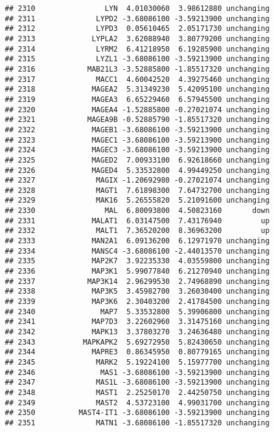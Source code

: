 \documentclass[]{article}
\begin{document}
\begin{verbatim}
## 2310                LYN  4.01030060  3.98612880 unchanging
## 2311              LYPD2 -3.68086100 -3.59213900 unchanging
## 2312              LYPD3  0.05610465  2.05171730 unchanging
## 2313             LYPLA2  3.62088940  3.80779200 unchanging
## 2314              LYRM2  6.41218950  6.19285900 unchanging
## 2315              LYZL1 -3.68086100 -3.59213900 unchanging
## 2316            MAB21L3 -3.52885800 -1.85517320 unchanging
## 2317              MACC1  4.60042520  4.39275460 unchanging
## 2318             MAGEA2  5.31349230  5.42095100 unchanging
## 2319             MAGEA3  6.65229460  6.57945500 unchanging
## 2320             MAGEA4 -1.52885800 -0.27021074 unchanging
## 2321            MAGEA9B -0.52885790 -1.85517320 unchanging
## 2322             MAGEB1 -3.68086100 -3.59213900 unchanging
## 2323             MAGEC1 -3.68086100 -3.59213900 unchanging
## 2324             MAGEC3 -3.68086100 -3.59213900 unchanging
## 2325             MAGED2  7.00933100  6.92618660 unchanging
## 2326             MAGED4  5.33532800  4.99449250 unchanging
## 2327              MAGIX -1.20692980 -0.27021074 unchanging
## 2328              MAGT1  7.61898300  7.64732700 unchanging
## 2329              MAK16  5.26555820  5.21091600 unchanging
## 2330                MAL  6.80093800  4.50823160       down
## 2331             MALAT1  6.03147500  7.43176940         up
## 2332              MALT1  7.36520200  8.36963200         up
## 2333             MAN2A1  6.09136200  6.12971970 unchanging
## 2334             MANSC4 -3.68086100 -2.44013570 unchanging
## 2335             MAP2K7  3.92235330  4.03559800 unchanging
## 2336             MAP3K1  5.99077840  6.21270940 unchanging
## 2337            MAP3K14  2.96299530  2.74968890 unchanging
## 2338             MAP3K5  3.45982700  3.26030400 unchanging
## 2339             MAP3K6  2.30403200  2.41784500 unchanging
## 2340               MAP7  5.33532800  5.39906800 unchanging
## 2341             MAP7D3  3.22602960  3.31475160 unchanging
## 2342             MAPK13  3.37803270  3.24636480 unchanging
## 2343           MAPKAPK2  5.69272950  5.82430650 unchanging
## 2344             MAPRE3  0.86345950  0.80779165 unchanging
## 2345              MARK2  5.19224100  5.15977700 unchanging
## 2346               MAS1 -3.68086100 -3.59213900 unchanging
## 2347              MAS1L -3.68086100 -3.59213900 unchanging
## 2348              MAST1  2.25250170  2.44250750 unchanging
## 2349              MAST2  4.53723100  4.99031700 unchanging
## 2350          MAST4-IT1 -3.68086100 -3.59213900 unchanging
## 2351              MATN1 -3.68086100 -1.85517320 unchanging

\end{verbatim}
\end{document}
